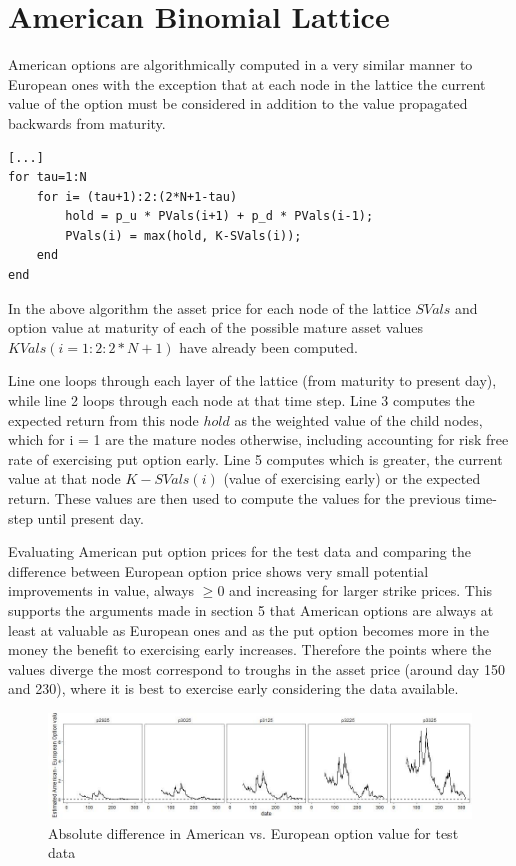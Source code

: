 \documentclass{sig-alternate-05-2015}
\begin{document}
\section{American Binomial Lattice}
American options are algorithmically computed in a very similar manner to European ones with the exception that at each node in the lattice the current value of the option must be considered in addition to the value propagated backwards from maturity. 

\begin{lstlisting} 
[...]
for tau=1:N
	for i= (tau+1):2:(2*N+1-tau)
		hold = p_u * PVals(i+1) + p_d * PVals(i-1);
		PVals(i) = max(hold, K-SVals(i));
	end
end
\end{lstlisting} 

In the above algorithm the asset price for each node of the lattice $SVals$ and option value at maturity of each of the possible mature asset values $KVals(i = 1:2:2*N+1)$ have already been computed.

Line one loops through each layer of the lattice (from maturity to present day), while line 2 loops through each node at that time step. Line 3 computes the expected return from this node $hold$ as the weighted value of the child nodes, which for i = 1 are the mature nodes otherwise, including accounting for risk free rate of exercising put option early. Line 5 computes which is greater, the current value at that node $K - SVals(i)$ (value of exercising early) or the expected return. These values are then used to compute the values for the previous time-step until present day.   

Evaluating American put option prices for the test data and comparing the difference between European option price shows very small potential improvements in value, always $\geq 0$ and increasing for larger strike prices. This supports the arguments made in section 5 that American options are always at least at valuable as European ones and as the put option becomes more in the money the benefit to exercising early increases. Therefore the points where the values diverge the most correspond to troughs in the asset price (around day 150 and 230), where it is best to exercise early considering the data available. 

\begin{figure}[h]
\includegraphics[width=\linewidth]{../Plots/Q6_1.jpg}
\centering
\caption{Absolute difference in American vs. European option value for test data}
\label{fig:Q6_1}
\end{figure} 
\end{document}

